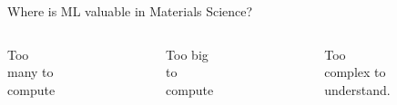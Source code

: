 \documentclass[aspectratio=169]{beamer}
\begin{document}
\begin{frame}[t]{Where is ML valuable in Materials Science?}
    \begin{columns}[t]
    Too many to compute
    \begin{figure}
        \centering
        \includegraphics[width=\textwidth]{lectures/slides_tex/figures/mp_data_hist.png}
    \end{figure}
Too big to compute
\begin{figure}
        \centering
        \includegraphics[width=\textwidth]{lectures/slides_tex/figures/mpea_poly.png}
    \end{figure}
Too complex to understand.
\begin{figure}

\end{figure}
\end{columns}
\end{frame}
\end{document}
